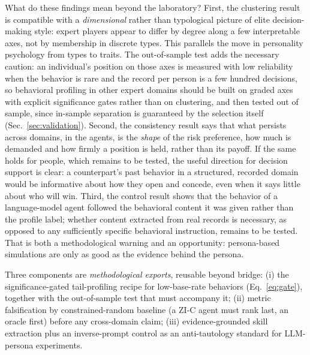 \documentclass[11pt,a4paper]{article}
\begin{document}
What do these findings mean beyond the laboratory? First, the
clustering result is compatible with a \emph{dimensional} rather than
typological picture of elite decision-making style: expert players
appear to differ by degree along a few interpretable axes, not by
membership in discrete types. This parallels the move in personality
psychology from types to traits. The out-of-sample test adds the
necessary caution: an individual's position on those axes is measured
with low reliability when the behavior is rare and the record per
person is a few hundred decisions, so behavioral profiling in other
expert domains should be built on graded axes with explicit
significance gates rather than on clustering, and then tested out of
sample, since in-sample separation is guaranteed by the selection
itself (Sec.~\ref{sec:validation}). Second, the consistency
result says that what persists across domains, in the agents, is the
\emph{shape} of the risk preference, how much is demanded and how
firmly a position is held, rather than its payoff. If the same holds
for people, which remains to be tested, the useful direction for
decision support is clear: a counterpart's past behavior in a
structured, recorded domain would be informative about how they open
and concede, even when it says little about who will win. Third, the
control result shows
that the behavior of a language-model agent followed the behavioral
content it was given rather than the profile label; whether content
extracted from real records is necessary, as opposed to any
sufficiently specific behavioral instruction, remains to be tested.
That is both a methodological warning and an opportunity: persona-based
simulations are only as good as the evidence behind the persona.

Three components are \emph{methodological exports}, reusable beyond
bridge: (i) the significance-gated tail-profiling recipe for
low-base-rate behaviors (Eq.~\ref{eq:gate}), together with the
out-of-sample test that must accompany it; (ii) metric falsification
by constrained-random baseline (a ZI-C agent must rank last, an oracle
first) before any cross-domain claim; (iii) evidence-grounded skill
extraction plus an inverse-prompt control as an anti-tautology standard
for LLM-persona experiments.
\end{document}
